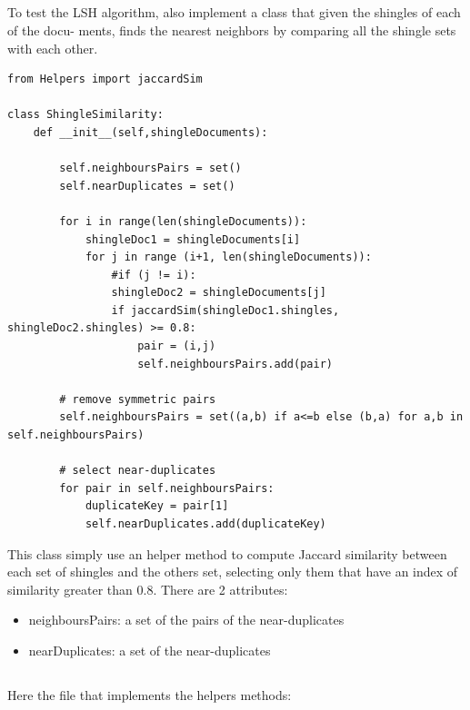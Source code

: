 \documentclass{article}
\begin{document}
\subsection{}
To test the LSH algorithm, also implement a class that given the shingles of each of the docu- ments, finds the nearest neighbors by comparing all the shingle sets with each other.

\begin{lstlisting}
from Helpers import jaccardSim

class ShingleSimilarity:
    def __init__(self,shingleDocuments):

        self.neighboursPairs = set()
        self.nearDuplicates = set()

        for i in range(len(shingleDocuments)):
            shingleDoc1 = shingleDocuments[i]
            for j in range (i+1, len(shingleDocuments)):
                #if (j != i):
                shingleDoc2 = shingleDocuments[j]
                if jaccardSim(shingleDoc1.shingles, shingleDoc2.shingles) >= 0.8:
                    pair = (i,j)
                    self.neighboursPairs.add(pair)

        # remove symmetric pairs
        self.neighboursPairs = set((a,b) if a<=b else (b,a) for a,b in self.neighboursPairs)

        # select near-duplicates
        for pair in self.neighboursPairs:
            duplicateKey = pair[1]
            self.nearDuplicates.add(duplicateKey)
\end{lstlisting}

This class simply use an helper method to compute Jaccard similarity between each set of shingles and the others set, selecting only them that have an index of similarity greater than 0.8.
There are 2 attributes:
\begin{itemize}
	\item neighboursPairs: a set of the pairs of the near-duplicates
	\item nearDuplicates: a set of the near-duplicates
\end{itemize}



\subsection{}
Here the file that implements the helpers methods:
\end{document}
